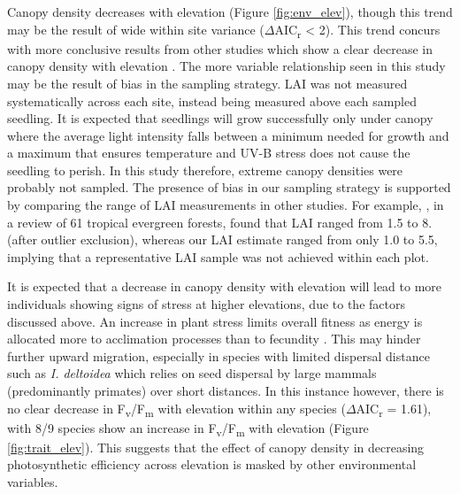 \documentclass[a4paper,10pt,]{report}
\begin{document}
Canopy density decreases with elevation (Figure \ref{fig:env_elev}), though this trend may be the result of wide within site variance ($\Delta$AIC\textsubscript{r} < 2). This trend concurs with more conclusive results from other studies which show a clear decrease in canopy density with elevation \citep{Kitayama2002, Moser2008}. The more variable relationship seen in this study may be the result of bias in the sampling strategy. LAI was not measured systematically across each site, instead being measured above each sampled seedling. It is expected that seedlings will grow successfully only under canopy where the average light intensity falls between a minimum needed for growth and a maximum that ensures temperature and UV-B stress does not cause the seedling to perish. In this study therefore, extreme canopy densities were probably not sampled. The presence of bias in our sampling strategy is supported by comparing the range of LAI measurements in other studies. For example, \citet{Asner2003}, in a review of 61 tropical evergreen forests, found that LAI ranged from 1.5 to 8. (after outlier exclusion), whereas our LAI estimate ranged from only 1.0 to 5.5, implying that a representative LAI sample was not achieved within each plot.

It is expected that a decrease in canopy density with elevation will lead to more individuals showing signs of stress at higher elevations, due to the factors discussed above. An increase in plant stress limits overall fitness as energy is allocated more to acclimation processes than to fecundity \citep{Reu2011}. This may hinder further upward migration, especially in species with limited dispersal distance such as \textit{I. deltoidea} which relies on seed dispersal by large mammals (predominantly primates) \citep{Russo2005, Kuprewicz2013} over short distances. In this instance however, there is no clear decrease in F\textsubscript{v}/F\textsubscript{m} with elevation within any species ($\Delta$AIC\textsubscript{r} = 1.61), with 8/9 species show an increase in F\textsubscript{v}/F\textsubscript{m} with elevation (Figure \ref{fig:trait_elev}). This suggests that the effect of canopy density in decreasing photosynthetic efficiency across elevation is masked by other environmental variables.

\end{document}
